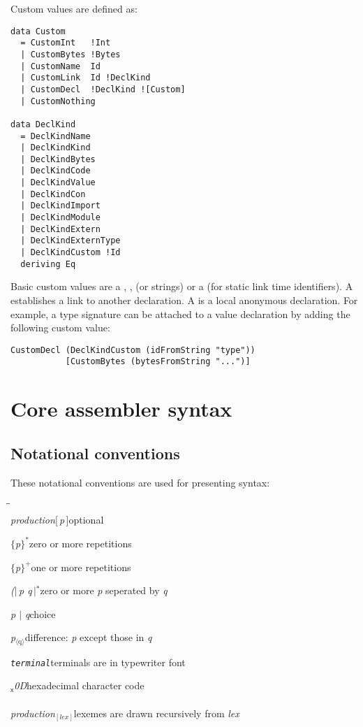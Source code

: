 \documentclass[a4paper,dvips]{article}
\newenvironment{productions}%
  {\begin{tabbing}\hspace{2cm}\=\hspace{6cm}\=\kill{}\\}%
  {\end{tabbing}}
\newcommand{\fixed}[1]{\makebox[3.5em]{#1}}
\newcommand{\production}[3]{\nont{#1}\>\fixed{$\rightarrow$}\nont{#2}\>#3\\}
\newcommand{\next}[2]{\strut{}\>\fixed{$|$}\nont{#1}\>#2\\}
\newcommand{\nont}[1]{\textit{#1}}
\newcommand{\opt}[1]{$[\,$#1$\,]$}
\newcommand{\many}[1]{$\{$#1$\}^*$}
\newcommand{\manyone}[1]{$\{$#1$\}^+$}
\newcommand{\manyi}[2]{$\{$#2$\}^{#1}$}
\newcommand{\sepby}[2]{{\rm (}\hspace{-0.5ex}$|\,$#1 #2$\,|$\hspace{-0.5ex}{\rm )}$^*$}
\newcommand{\diff}[2]{#1$_{\langle\mbox{#2}\rangle}$}
\newcommand{\term}[1]{{\tt #1}}
\newcommand{\charcode}[1]{{\rm $_\textsf{x}$#1}}
\newcommand{\por}{$|$}
\newcommand{\lex}[2]{\nont{#2}$_{[\nont{#1}]}$}
\begin{document}
Custom values are defined as:
\begin{verbatim}
data Custom
  = CustomInt   !Int
  | CustomBytes !Bytes
  | CustomName  Id
  | CustomLink  Id !DeclKind
  | CustomDecl  !DeclKind ![Custom]
  | CustomNothing

data DeclKind 
  = DeclKindName
  | DeclKindKind
  | DeclKindBytes
  | DeclKindCode
  | DeclKindValue
  | DeclKindCon
  | DeclKindImport
  | DeclKindModule
  | DeclKindExtern
  | DeclKindExternType
  | DeclKindCustom !Id
  deriving Eq
\end{verbatim}

Basic custom values are a \verb@CustomNothing@, \verb@CustomInt@, 
\verb@CustomBytes@ (or strings) 
or a \verb@CustomName@ (for static link time identifiers). A \verb@CustomLink@
establishes a link to another declaration. A \verb@CustomDecl@ is a local
anonymous declaration. For example, a type signature can be attached to a 
value declaration by adding the following custom value:
\begin{verbatim}
CustomDecl (DeclKindCustom (idFromString "type")) 
           [CustomBytes (bytesFromString "...")]
\end{verbatim}


\section{Core assembler syntax}

\subsection{Notational conventions}

These notational conventions are used for presenting syntax:
\begin{productions}
\production{production}{\opt{p}}{optional}
\next{\many{p}}{zero or more repetitions}
\next{\manyone{p}}{one or more repetitions}
\next{\sepby{p}{q}}{zero or more \nont{p} seperated by \nont{q}}
\next{p \por{} q}{choice}
\next{\diff{p}{q}}{difference: \nont{p} except those in \nont{q}}
\next{\term{terminal}}{terminals are in typewriter font}
\next{\charcode{0D}}{hexadecimal character code}
\\
\production{\lex{lex}{production}}{}{lexemes are drawn recursively from \nont{lex}}
\end{productions}
\end{document}
